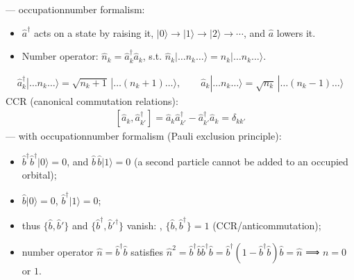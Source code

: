 \documentclass[letterpaper,10pt,english]{jupyterBook}
\begin{document}
\sphinxAtStartPar
{} — occupation\sphinxhyphen{}number formalism:
\begin{itemize}
\item {} 
\sphinxAtStartPar
\(\hat a^\dagger\) acts on a state by raising it, \(|0\rangle\to|1\rangle\to|2\rangle\to\cdots\), and \(\hat a\) lowers it.

\item {} 
\sphinxAtStartPar
Number operator: \(\hat n_k=\hat a_k^\dagger\hat a_k\), s.t. \(\hat n_k|\dots n_k\dots\rangle=n_k|\dots n_k\dots\rangle\).

\end{itemize}
\begin{equation*}
\begin{split}
\hat a^\dagger_k|\dots n_k\dots\rangle=\sqrt{n_k+1}\,|\dots(n_k+1)\dots\rangle,\qquad
\hat a_k|\dots n_k\dots\rangle=\sqrt{n_k}\,|\dots(n_k-1)\dots\rangle
\end{split}
\end{equation*}
\sphinxAtStartPar
CCR (canonical commutation relations):
\begin{equation*}
\begin{split}
[\hat a_k,\hat a^\dagger_{k'}]=\hat a_k\hat a^\dagger_{k'}-\hat a^\dagger_{k'}\hat a_k=\delta_{kk'}
\end{split}
\end{equation*}
\sphinxAtStartPar
{} — with occupation\sphinxhyphen{}number formalism (Pauli exclusion principle):
\begin{itemize}
\item {} 
\sphinxAtStartPar
\(\hat b^\dagger\hat b^\dagger|0\rangle=0\), and \(\hat b\,\hat b|1\rangle=0\) (a second particle cannot be added to an occupied orbital);

\item {} 
\sphinxAtStartPar
\(\hat b|0\rangle=0\), \(\hat b^\dagger|1\rangle=0\);

\item {} 
\sphinxAtStartPar
thus \(\{\hat b,\hat b'\}\) and \(\{\hat b^\dagger,\hat b'^\dagger\}\) vanish: , \(\{\hat b,\hat b^\dagger\}=1\) (CCR/anticommutation);

\item {} 
\sphinxAtStartPar
number operator \(\hat n=\hat b^\dagger\hat b\) satisfies \(\hat n^2=\hat b^\dagger\hat b\hat b^\dagger\hat b=\hat b^\dagger(1-\hat b^\dagger\hat b)\hat b=\hat n\) ⟹ \(n=0\) or \(1\).

\end{itemize}
\end{document}
